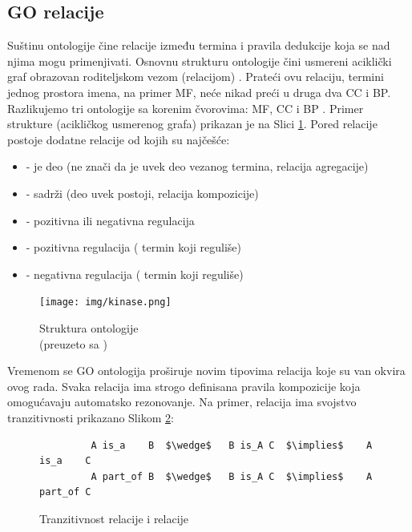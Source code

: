 \subsection{GO relacije}

Suštinu ontologije čine relacije između termina i pravila dedukcije koja se nad
njima mogu primenjivati. Osnovnu strukturu ontologije čini usmereni aciklički
graf  obrazovan roditeljskom vezom (relacijom) . Prateći
ovu relaciju, termini jednog prostora imena, na primer MF, neće nikad preći u
druga dva CC i BP. Razlikujemo tri ontologije sa korenim čvorovima:  MF, CC i BP
\parencite{go_struktura}. Primer strukture (acikličkog usmerenog grafa) prikazan je na
Slici \ref{fig:kinase}.  Pored relacije  postoje dodatne relacije od kojih
su najčešće:

\begin{itemize}
  \item {}  - je deo  (ne znači da je uvek deo vezanog termina, relacija agregacije)
  \item {} - sadrži (deo uvek postoji, relacija kompozicije)
  \item {} - pozitivna ili negativna regulacija
  \item {} - pozitivna regulacija  
    ( termin koji reguliše)
  \item {} - negativna regulacija 
    ( termin koji reguliše)
\end{itemize}

\begin{figure}[h!]
  \centering
  \texttt{[image: img/kinase.png]}
  \caption{Struktura ontologije\\ \footnotesize (preuzeto sa \parencite{go_veb})}
  \label{fig:kinase}
\end{figure}

Vremenom se GO ontologija proširuje novim tipovima relacija koje su van okvira ovog rada.
Svaka relacija ima strogo definisana pravila kompozicije koja omogućavaju
automatsko rezonovanje. Na primer, relacija  ima svojstvo
tranzitivnosti \parencite{is_a} prikazano Slikom \ref{fig:is_a}:
\lstset{
  basicstyle=\ttfamily, mathescape,
  numbers=none
}

\begin{figure}[h!]
  \centering
\begin{lstlisting}
         A is_a    B  $\wedge$   B is_A C  $\implies$    A is_a    C           
         A part_of B  $\wedge$   B is_A C  $\implies$    A part_of C
\end{lstlisting}
\caption{Tranzitivnost relacije  i relacije }
  \label{fig:is_a}
\end{figure}


